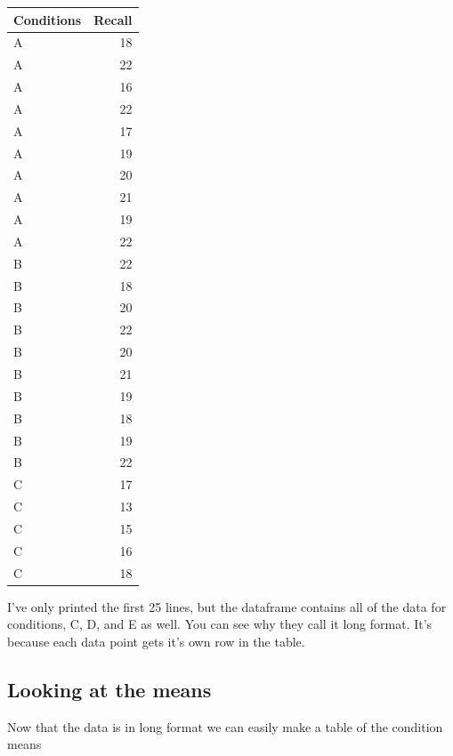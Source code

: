\begin{tabular}{l|r}
\hline
Conditions & Recall\\
\hline
A & 18\\
\hline
A & 22\\
\hline
A & 16\\
\hline
A & 22\\
\hline
A & 17\\
\hline
A & 19\\
\hline
A & 20\\
\hline
A & 21\\
\hline
A & 19\\
\hline
A & 22\\
\hline
B & 22\\
\hline
B & 18\\
\hline
B & 20\\
\hline
B & 22\\
\hline
B & 20\\
\hline
B & 21\\
\hline
B & 19\\
\hline
B & 18\\
\hline
B & 19\\
\hline
B & 22\\
\hline
C & 17\\
\hline
C & 13\\
\hline
C & 15\\
\hline
C & 16\\
\hline
C & 18\\
\hline
\end{tabular}

I've only printed the first 25 lines, but the dataframe contains all of
the data for conditions, C, D, and E as well. You can see why they call
it long format. It's because each data point gets it's own row in the
table.

\subsection{Looking at the means}\label{looking-at-the-means}

Now that the data is in long format we can easily make a table of the
condition means

\begin{Shaded}
\begin{Highlighting}[]
\NormalTok{)}
\end{Highlighting}
\end{Shaded}

